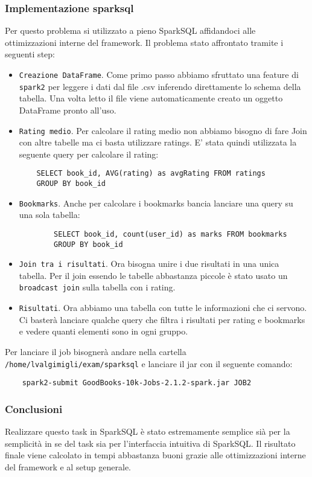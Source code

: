 \subsubsection{Implementazione sparksql}
Per questo problema si \è utilizzato a pieno SparkSQL affidandoci alle ottimizzazioni interne del framework. Il problema
\è stato affrontato tramite i seguenti step:
\begin{itemize}
    \item \texttt{Creazione DataFrame}. Come primo passo abbiamo sfruttato una feature di \texttt{spark2} per leggere
    i dati dal file .csv inferendo direttamente lo schema della tabella. Una volta letto il file viene automaticamente creato
    un oggetto DataFrame pronto all'uso.
    \item \texttt{Rating medio}. Per calcolare il rating medio non abbiamo bisogno di fare Join con altre tabelle ma ci basta utilizzare
    ratings. E' stata quindi utilizzata la seguente query per calcolare il rating:
    \begin{verbatim}
    SELECT book_id, AVG(rating) as avgRating FROM ratings
    GROUP BY book_id
    \end{verbatim}
    \item \texttt{Bookmarks}. Anche per calcolare i bookmarks bancia lanciare una query su una sola tabella:
    \begin{verbatim}
        SELECT book_id, count(user_id) as marks FROM bookmarks
        GROUP BY book_id
    \end{verbatim}
    \item \texttt{Join tra i risultati}. Ora bisogna unire i due risultati in una unica tabella. Per il join essendo le
    tabelle abbastanza piccole è stato usato un \texttt{broadcast join} sulla tabella con i rating.
    \item \texttt{Risultati}. Ora abbiamo una tabella con tutte le informazioni che ci servono.
    Ci basterà lanciare qualche query che filtra i risultati per rating e bookmarks e vedere quanti elementi sono in
    ogni gruppo.
\end{itemize}

Per lanciare il job bisognerà andare nella cartella \texttt{/home/lvalgimigli/exam/sparksql} e lanciare il jar con il seguente comando:
\begin{verbatim}
    spark2-submit GoodBooks-10k-Jobs-2.1.2-spark.jar JOB2
\end{verbatim}

\subsubsection{Conclusioni}

Realizzare questo task in SparkSQL è stato estremamente semplice sià per la semplicità in se del task sia per l'interfaccia
intuitiva di SparkSQL. Il risultato finale viene calcolato in tempi abbastanza buoni grazie alle ottimizzazioni interne del framework e
al setup generale.

